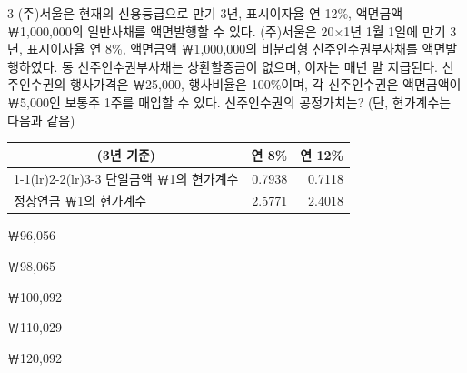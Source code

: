 \begin{question}{3}
(주)서울은 현재의 신용등급으로 만기 3년, 표시이자율 연 12\%, 액면금액 ￦1,000,000의 일반사채를 액면발행할 수 있다. (주)서울은 20×1년 1월 1일에 만기 3년, 표시이자율 연 8\%, 액면금액 ￦1,000,000의 비분리형 신주인수권부사채를 액면발행하였다. 동 신주인수권부사채는 상환할증금이 없으며, 이자는 매년 말 지급된다. 신주인수권의 행사가격은 ￦25,000, 행사비율은 100\%이며, 각 신주인수권은 액면금액이 ￦5,000인 보통주 1주를 매입할 수 있다. 신주인수권의 공정가치는? (단, 현가계수는 다음과 같음)

{\small\centering
\begin{tabular}{lrr}
\hline
\multicolumn{1}{c}{(3년 기준)} & \multicolumn{1}{c}{연 8\%} & \multicolumn{1}{c}{연 12\%} \\
\cmidrule(lr){1-1}\cmidrule(lr){2-2}\cmidrule(lr){3-3}
단일금액 ￦1의 현가계수 & 0.7938 & 0.7118 \\
정상연금 ￦1의 현가계수 & 2.5771 & 2.4018 \\
\hline
\end{tabular}\par}

\begin{choices}
  \item ￦96,056
  \item ￦98,065
  \item ￦100,092
  \item ￦110,029
  \item ￦120,092
\end{choices}
\end{question}
